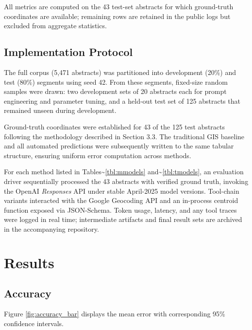 All metrics are computed on the 43 test-set abstracts for which
ground-truth coordinates are available; remaining rows are retained in
the public logs but excluded from aggregate statistics.

\subsection{Implementation Protocol}\label{implementation-protocol}

The full corpus (5,471 abstracts) was partitioned into development
(20\%) and test (80\%) segments using seed 42. From these segments,
fixed-size random samples were drawn: two development sets of 20
abstracts each for prompt engineering and parameter tuning, and a
held-out test set of 125 abstracts that remained unseen during
development.

Ground-truth coordinates were established for 43 of the 125 test
abstracts following the methodology described in Section 3.3. The
traditional GIS baseline and all automated predictions were subsequently
written to the same tabular structure, ensuring uniform error
computation across methods.

For each method listed in Tables\textasciitilde{}\ref{tbl:mmodels}
and\textasciitilde{}\ref{tbl:tmodels}, an evaluation driver sequentially
processed the 43 abstracts with verified ground truth, invoking the
OpenAI \emph{Responses} API under stable April-2025 model versions.
Tool-chain variants interacted with the Google Geocoding API and an
in-process centroid function exposed via JSON-Schema. Token usage,
latency, and any tool traces were logged in real time; intermediate
artifacts and final result sets are archived in the accompanying
repository.

\section{Results}\label{results}

\subsection{Accuracy}\label{accuracy}

Figure \ref{fig:accuracy_bar} displays the mean error with corresponding
95\% confidence intervals.

